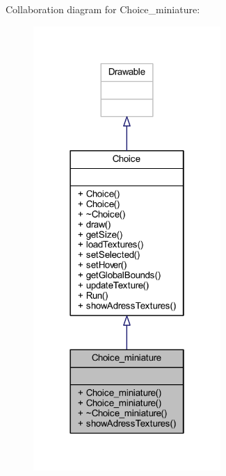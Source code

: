 Collaboration diagram for Choice\+\_\+miniature\+:\nopagebreak
\begin{figure}[H]
\begin{center}
\leavevmode
\includegraphics[width=202pt]{class_choice__miniature__coll__graph}
\end{center}
\end{figure}
